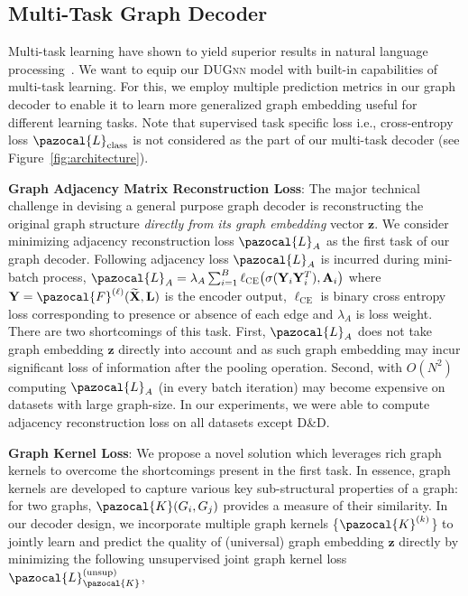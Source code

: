 \documentclass{article}
\newcommand{\La}{\pazocal{L}}
\newcommand{\Fa}{\pazocal{F}}
\newcommand{\Ka}{\pazocal{K}}
\begin{document}
\vspace{-0.8em}
\subsection{Multi-Task Graph Decoder}
\vspace{-0.7em}
Multi-task learning     have shown to yield superior results in natural language processing~\cite{mccann2018natural, devlin2018bert}. We want to equip our  \textsc{DUGnn}  model with built-in capabilities of multi-task learning. For this, we employ multiple prediction metrics in our graph decoder to enable it to learn more generalized graph embedding useful for different learning tasks. Note that supervised task specific  loss i.e.,  cross-entropy loss $\La_{\text{class}}$  is not considered as the part of our multi-task decoder (see Figure~\ref{fig:architecture}).

\noindent \textbf{Graph Adjacency Matrix Reconstruction Loss}: The major technical challenge in devising a general purpose graph decoder is reconstructing the original graph structure {\em directly from its graph embedding} vector $\mathbf{z}$. 
We consider minimizing adjacency reconstruction loss  $\La_{A}$ as the first task of our graph decoder. Following adjacency loss  $\La_{A}$ is incurred during mini-batch process, $\La_{A} =   \lambda_A\sum_{i=1}^{B} \ell_{\textsc{CE}}\big(\sigma(\mathbf{Y}_i \mathbf{Y}_i^{T}), \mathbf{A}_{i}\big)$
where $\mathbf{Y} = \Fa^{(\ell)}(\mathbf{\widetilde{X}}, \mathbf{L})$ is the encoder output, $\ell_{\text{CE}}$ is binary cross entropy loss corresponding to presence or absence of each edge and $\lambda_A$ is loss weight.  There are two shortcomings of this task. First, $\La_A$   does not take  graph embedding $\mathbf{z}$ directly into account and as such   graph embedding may incur significant loss of information after the pooling operation. Second,  with $O(N^2)$ computing $\La_{A}$ (in every batch iteration) may become   expensive on datasets with large graph-size. In our experiments,  we were able to compute adjacency  reconstruction loss on all  datasets except D\&D.








\noindent \textbf{Graph Kernel Loss}: We propose a novel solution which leverages rich graph kernels to overcome the shortcomings present in  the  first task. In essence, graph kernels are developed to capture various key sub-structural properties of a graph: for two graphs, $\Ka(G_i,G_j)$ provides a measure of their similarity. 
In our decoder design, we incorporate multiple graph kernels \{$\Ka^{(k)}$\}  to jointly learn and predict the quality of (universal) graph 
embedding $\mathbf{z}$ directly by minimizing the following unsupervised  joint graph kernel loss  $\La_{\Ka}^{(\text{unsup})}$, 
\end{document}
